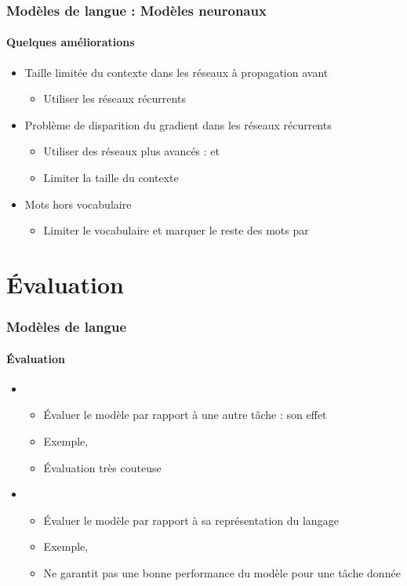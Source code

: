 \documentclass[xcolor=table]{beamer}
\begin{document}
\begin{frame}
\frametitle{Modèles de langue : Modèles neuronaux}
\framesubtitle{Quelques améliorations}

\begin{itemize}
	\item Taille limitée du contexte dans les réseaux à propagation avant
	\begin{itemize}
		\item Utiliser les réseaux récurrents
	\end{itemize}
	\item Problème de disparition du gradient dans les réseaux récurrents
	\begin{itemize}
		\item Utiliser des réseaux plus avancés :  et 
		\item Limiter la taille du contexte 
	\end{itemize}
	\item Mots hors vocabulaire
	\begin{itemize}
		\item Limiter le vocabulaire  et marquer le reste des mots par 
	\end{itemize}
\end{itemize}

\end{frame}

\section{Évaluation}

\begin{frame}
\frametitle{Modèles de langue}
\framesubtitle{Évaluation}

\begin{itemize}
	\item {}
	\begin{itemize}
		\item Évaluer le modèle par rapport à une autre tâche : son effet
		\item Exemple,  
		\item Évaluation très couteuse
	\end{itemize}
	\item {}
	\begin{itemize}
		\item Évaluer le modèle par rapport à sa représentation du langage
		\item Exemple,  
		\item Ne garantit pas une bonne performance du modèle pour une tâche donnée
	\end{itemize}
\end{itemize}

\end{frame}
\end{document}
